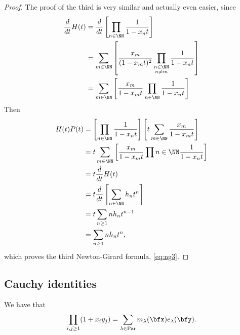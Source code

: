 \documentclass{article}
\DeclareMathOperator{\Par}{Par}
\begin{document}
\begin{proof}
    The proof of the third is very similar and actually even easier, since
    \begin{align*}
        \frac{d}{dt}H(t) &= \frac{d}{dt}\left[\prod_{n\in\NN}\frac{1}{1-x_nt}\right] \\
                         &= \sum_{m\in\NN}\left[\frac{x_m}{(1-x_mt)^2}\prod_{\substack{n\in\NN \\ n \neq m}}\frac{1}{1-x_nt}\right] \\ 
                         &= \sum_{m\in\NN}\left[\frac{x_m}{1-x_mt}\prod_{n\in\NN}\frac{1}{1-x_nt}\right]
    \end{align*}
    Then
    \begin{align*}
        H(t)P(t) &= \left[\prod_{n\in\NN}\frac{1}{1-x_nt}\right]\left[t\sum_{m\in\NN}\frac{x_m}{1-x_mt}\right] \\
                 &= t\sum_{m\in\NN}\left[\frac{x_m}{1-x_mt}\prod{n\in\NN}\frac{1}{1-x_nt}\right] \\
                 &= t\frac{d}{dt}H(t) \\
                 &= t\frac{d}{dt}\left[\sum_{n\in\NN}h_nt^n\right] \\
                 &= t\sum_{n\geq 1}nh_nt^{n-1} \\
                 &= \sum_{n\geq 1}nh_nt^n,
    \end{align*}
    which proves the third Newton-Girard formula, \eqref{eq:ng3}.
\end{proof}

\subsection{Cauchy identities}

\begin{theorem}\label{CauchyIdentityForME}
    We have that
    \[
        \prod_{i,j \geq 1}
        (1+x_iy_j)
        =
        \sum_{\lambda\in\Par}
        m_\lambda(\bfx)e_\lambda(\bfy).
    \]
\end{theorem}
\end{document}
